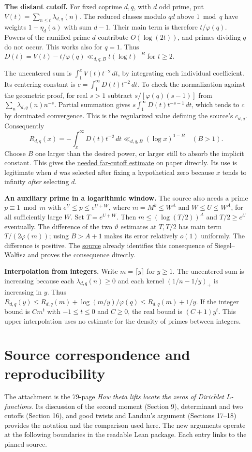 \documentclass[11pt]{article}
\newcommand{\src}[3]{\href{https://github.com/VladimirReshetnikov/ProveIt/blob/d8415e76ad850651f8c0083afe689dd9f4a45a10/Analysis/GeneralizedRiemannHypothesis/vendor/grh-lean/grh/src/#1.lean\#L#2}{#3}}
\begin{document}
\textbf{The distant cutoff.} For fixed coprime $d,q$, with $d$ odd prime, put $V(t)=\sum_{n\le t}\lambda_{d,q}(n)$. The reduced classes modulo $qd$ above $1\bmod q$ have weights $1-\eta_d(a)$ with sum $d-1$. Their main term is therefore $t/\varphi(q)$. Powers of the ramified prime $d$ contribute $O(\log(2t))$, and primes dividing $q$ do not occur. This works also for $q=1$. Thus $D(t)=V(t)-t/\varphi(q)\ll_{d,q,B}t(\log t)^{-B}$ for $t\ge2$.

The uncentered sum is $\int_1^x V(t)t^{-2}\,dt$, by integrating each individual coefficient. Its centering constant is $c=\int_1^\infty D(t)t^{-2}\,dt$. To check the normalization against the geometric proof, for real $s>1$ subtract $s/[\varphi(q)(s-1)]$ from $\sum_n\lambda_{d,q}(n)n^{-s}$. Partial summation gives $s\int_1^\infty D(t)t^{-s-1}\,dt$, which tends to $c$ by dominated convergence. This is the regularized value defining the source's $c_{d,q}$. Consequently
\[
 R_{d,q}(x)=-\int_x^\infty D(t)t^{-2}\,dt\ll_{d,q,B}(\log x)^{1-B}\quad(B>1).
\]
Choose $B$ one larger than the desired power, or larger still to absorb the implicit constant. This gives the \src{New/Reduction/Zeros/PrimeNumberTheorem}{217}{needed far-cutoff estimate} on paper directly. Its use is legitimate when $d$ was selected after fixing a hypothetical zero because $x$ tends to infinity \emph{after} selecting $d$.

\textbf{An auxiliary prime in a logarithmic window.} The source also needs a prime $p\equiv1\bmod m$ with $e^U\le p\le e^{U+W}$, where $m=M^k\le W^A$ and $W\le U\le W^A$, for all sufficiently large $W$. Set $T=e^{U+W}$. Then $m\le(\log(T/2))^A$ and $T/2\ge e^U$ eventually. The difference of the two $\vartheta$ estimates at $T,T/2$ has main term $T/(2\varphi(m))$; using $B>A+1$ makes its error relatively $o(1)$ uniformly. The difference is positive. The \src{Lib/Analytic/Primes}{389}{source} already identifies this consequence of Siegel--Walfisz and proves the consequence directly.

\textbf{Interpolation from integers.} Write $m=\lceil y\rceil$ for $y\ge1$. The uncentered sum is increasing because each $\lambda_{d,q}(n)\ge0$ and each kernel $(1/n-1/y)_+$ is increasing in $y$. Thus $R_{d,q}(y)\le R_{d,q}(m)+\log(m/y)/\varphi(q)\le R_{d,q}(m)+1/y$. If the integer bound is $Cm^t$ with $-1\le t\le0$ and $C\ge0$, the real bound is $(C+1)y^t$. This upper interpolation uses no estimate for the density of primes between integers.

\newpage
\section{Source correspondence and reproducibility}
The attachment is the 79-page \emph{How theta lifts locate the zeros of Dirichlet $L$-functions}. Its discussion of the second moment (Section 9), determinant and two cutoffs (Section 16), and good twists and Landau's argument (Sections 17--18) provides the notation and the comparison used here. The new arguments operate at the following boundaries in the readable Lean package. Each entry links to the pinned source.
\end{document}
